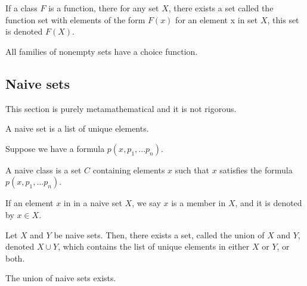 \begin{definition}
	\label{axiom-schema-replacement}
	If a class $F$ is a function, there for any set $X$, there exists a set called the function set with elements of the form $F(x)$ for an element x in set $X$, this set is denoted $F(X)$.
\end{definition}

\begin{definition}
	\label{axiom-strong-choice}
	All families of nonempty sets have a choice function.
\end{definition}
\subsection{Naive sets}

This section is purely metamathematical and it is not rigorous.

\begin{definition}
	\label{definition-naive-set}
	A naive set is a list of unique elements.
\end{definition}

\begin{definition}
	\label{definition-naive-class}
	Suppose we have a formula $p(x, p_1, ... p_n)$.

	A naive class is a set $C$ containing elements $x$ such that $x$ satisfies the formula $p(x, p_1, ... p_n)$.
\end{definition}

\begin{definition}
	\label{definition-naive-membership}
	If an element $x$ in in a naive set $X$, we say $x$ is a member in $X$, and it is denoted by $x \in X$.
\end{definition}

\begin{definition}
	\label{definition-naive-set-union}
	Let $X$ and $Y$ be naive sets.
	Then, there exists a set, called the union of $X$ and $Y$, denoted $X \cup Y$, which contains the list of unique elements in either $X$ or $Y$, or both.
\end{definition}

\begin{lemma}
	\label{lemma-union-exists}
	The union of naive sets exists.
\end{lemma}

